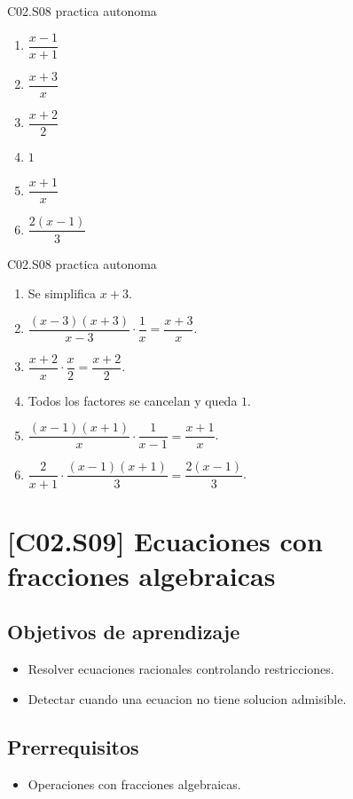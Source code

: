 \begin{shortanswer}{C02.S08 practica autonoma}
\begin{enumerate}[label=\textbf{PX-C02.S08-\arabic*:}, leftmargin=*]
  \item \(\dfrac{x-1}{x+1}\)
  \item \(\dfrac{x+3}{x}\)
  \item \(\dfrac{x+2}{2}\)
  \item \(1\)
  \item \(\dfrac{x+1}{x}\)
  \item \(\dfrac{2(x-1)}{3}\)
\end{enumerate}
\end{shortanswer}

\begin{fullsolution}{C02.S08 practica autonoma}
\begin{enumerate}[label=\textbf{PX-C02.S08-\arabic*:}, leftmargin=*]
  \item Se simplifica \(x+3\).
  \item \(\dfrac{(x-3)(x+3)}{x-3}\cdot \dfrac{1}{x}=\dfrac{x+3}{x}\).
  \item \(\dfrac{x+2}{x}\cdot \dfrac{x}{2}=\dfrac{x+2}{2}\).
  \item Todos los factores se cancelan y queda \(1\).
  \item \(\dfrac{(x-1)(x+1)}{x}\cdot \dfrac{1}{x-1}=\dfrac{x+1}{x}\).
  \item \(\dfrac{2}{x+1}\cdot \dfrac{(x-1)(x+1)}{3}=\dfrac{2(x-1)}{3}\).
\end{enumerate}
\end{fullsolution}

\section{[C02.S09] Ecuaciones con fracciones algebraicas}

\subsection*{Objetivos de aprendizaje}
\begin{itemize}
  \item Resolver ecuaciones racionales controlando restricciones.
  \item Detectar cuando una ecuacion no tiene solucion admisible.
\end{itemize}

\subsection*{Prerrequisitos}
\begin{itemize}
  \item Operaciones con fracciones algebraicas.
\end{itemize}

